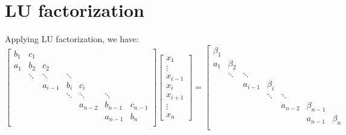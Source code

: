 \documentclass[landscape]{article}
\begin{document}
\section{LU factorization}
Applying LU factorization, we have:
\[
\left[\begin{array}{ccccccccc}
b_{1} & c_{1}    &           &           &           &           &         \\
a_{1} & b_{2}    & c_{2}     &           &           &           &         \\
      & \ddots   & \ddots    & \ddots    &           &           &         \\
      &          & a_{i-1}   & b_{i}     & c_{i}     &           &         \\
      &          &           & \ddots    & \ddots    & \ddots    &         \\
      &          &           &           & a_{n-2}   & b_{n-1}   & c_{n-1} \\
      &          &           &           &           & a_{n-1}   & b_{n}   \\
\end{array} \right]
\left[ \begin{array}{c}
x_{1} \\ \vdots \\ x_{i-1} \\ x_{i} \\ x_{i+1} \\ \vdots \\ x_{n}
\end{array} \right]
=
\left[\begin{array}{ccccccccc}
\beta_{1}  &               &              &              &              &             &           \\
a_{1}      & \beta_{2}     &              &              &              &             &           \\
           & \ddots        & \ddots       &              &              &             &           \\
           &               & a_{i-1}      & \beta_{i}    &              &             &           \\
           &               &              & \ddots       & \ddots       &             &           \\
           &               &              &              & a_{n-2}      & \beta_{n-1} &           \\
           &               &              &              &              & a_{n-1}     & \beta_{n} \\

\end{array}\]
\end{document}
